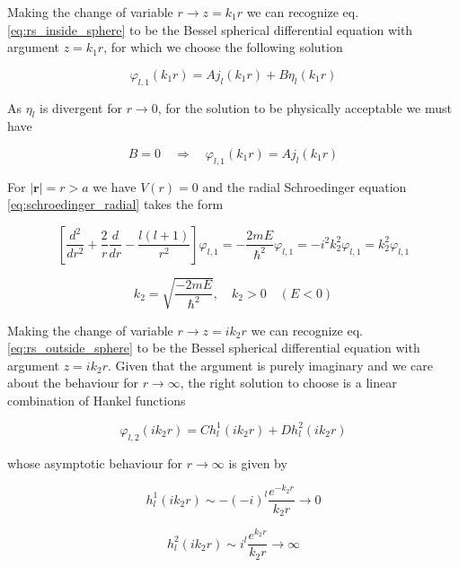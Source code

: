 \documentclass{article}
\begin{document}
Making the change of variable \( r \rightarrow z = k_1r \) we can recognize eq. \eqref{eq:rs_inside_sphere} to be the Bessel spherical differential equation with argument \(z = k_1 r\), for which we choose the following solution

\begin{equation}
\varphi_{l,1}(k_1r) = A j_l(k_1r) + B \eta_l(k_1r)
\end{equation}

As \( \eta_l \) is divergent for \( r \rightarrow 0 \), for the solution to be physically acceptable we must have

\begin{equation}
B = 0 \quad \Rightarrow \quad \varphi_{l,1}(k_1r) = A j_l(k_1r)
\end{equation}

For \( \left| \bm{r} \right| = r > a \) we have \( V(r) = 0 \) and the radial Schroedinger equation \eqref{eq:schroedinger_radial} takes the form

\begin{equation}
\label{eq:rs_outside_sphere}
\left[ \frac{d^2}{dr^2} + \frac{2}{r} \frac{d}{dr} - \frac{l \left(l+1 \right)}{r^2} \right] \varphi_{l,1} = - \frac{2mE}{\hbar^2} \varphi_{l,1} = - i^2 k_2^2 \varphi_{l,1} = k_2^2 \varphi_{l,1}
\end{equation}

\begin{equation}
k_2 = \sqrt{\frac{-2mE}{\hbar^2}}, \quad k_2 > 0 \quad (E<0)
\end{equation}

Making the change of variable \( r \rightarrow z = i k_2 r \) we can recognize eq. \eqref{eq:rs_outside_sphere} to be the Bessel spherical differential equation with argument \(z = i k_2 r\). Given that the argument is purely imaginary and we care about the behaviour for \( r \rightarrow \infty \), the right solution to choose is a linear combination of Hankel functions

\begin{equation}
\varphi_{l,2}(ik_2r) = C h_l^1(ik_2r) + D h_l^2(ik_2r)
\end{equation} 

whose asymptotic behaviour for \( r \rightarrow \infty \) is given by

\begin{equation}
h_l^1(ik_2r) \sim -(-i)^l \frac{e^{-k_2r}}{k_2r} \rightarrow 0
\end{equation}

\begin{equation}
\label{eq:h2_asymptotic}
h_l^2(ik_2r) \sim i^l \frac{e^{k_2r}}{k_2r} \rightarrow \infty
\end{equation}
\end{document}
